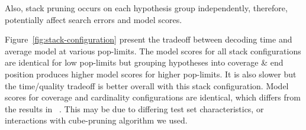 \documentclass[11pt]{article}
\begin{document}
Also, stack pruning occurs on each hypothesis group independently, therefore, potentially affect search errors and model scores. 

Figure~\ref{fig:stack-configuration} present the tradeoff between decoding time and average model at various pop-limits. The model scores for all stack configurations are identical for low pop-limits but grouping hypotheses into coverage \& end position produces higher model scores for higher pop-limits. It is also slower but the time/quality tradeoff is better overall with this stack configuration. Model scores for coverage and cardinality configurations are identical, which differs from the results in ~. This may be due to differing test set characteristics, or interactions with cube-pruning algorithm we used.
\end{document}
